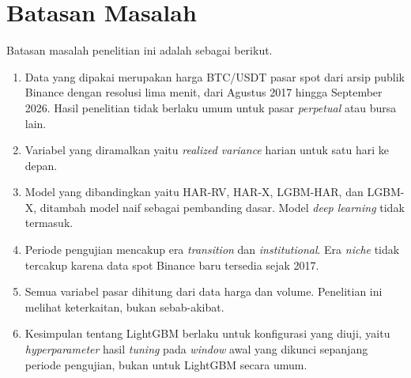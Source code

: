 \section{Batasan Masalah}
Batasan masalah penelitian ini adalah sebagai berikut.
\begin{enumerate}
  \item Data yang dipakai merupakan harga BTC/USDT pasar spot dari arsip
        publik Binance dengan resolusi lima menit, dari Agustus 2017 hingga
        September 2026. Hasil penelitian tidak berlaku umum untuk pasar
        \textit{perpetual} atau bursa lain.
  \item Variabel yang diramalkan yaitu \textit{realized variance} harian untuk
        satu hari ke depan.
  \item Model yang dibandingkan yaitu HAR-RV, HAR-X, LGBM-HAR, dan
        LGBM-X, ditambah model naif sebagai pembanding dasar. Model
        \textit{deep learning} tidak termasuk.
  \item Periode pengujian mencakup era \textit{transition} dan
        \textit{institutional}. Era \textit{niche} tidak tercakup karena data
        spot Binance baru tersedia sejak 2017.
  \item Semua variabel pasar dihitung dari data harga dan volume. Penelitian
        ini melihat keterkaitan, bukan sebab-akibat.
  \item Kesimpulan tentang LightGBM berlaku untuk konfigurasi yang diuji, yaitu
        \textit{hyperparameter} hasil \textit{tuning} pada \textit{window} awal
        yang dikunci sepanjang periode pengujian, bukan untuk LightGBM secara
        umum.
\end{enumerate}
